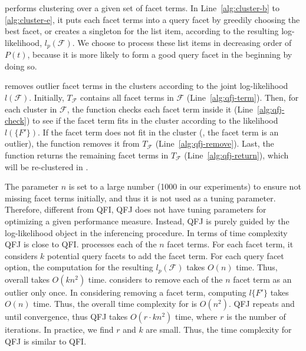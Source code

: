  performs clustering over a given set of facet terms.
In Line~\ref{alg:cluster-b} to \ref{alg:cluster-e}, it puts each facet terms into a query facet by greedily choosing the best facet, or creates a singleton for the list item, according to the resulting log-likelihood, $l_p(\mathcal{F})$.
We choose to process these list items in decreasing order of $P(t)$, because it is more likely to form a good query facet in the beginning by doing so.

 removes outlier facet terms in the clusters according to the joint log-likelihood $l(\mathcal{F})$. Initially, $T_\mathcal{F}$ contains all facet terms in $\mathcal{F}$ (Line~\ref{alg:qfj-term}). Then, for each cluster in $\mathcal{F}$, the function checks each facet term inside it (Line~\ref{alg:qfj-check}) to see if the facet term fits in the cluster according to the likelihood $l(\{F'\})$. If the facet term does not fit in the cluster (\ie, the facet term is an outlier), the function removes it from $T_\mathcal{F}$ (Line~\ref{alg:qfj-remove}). Last, the function returns the remaining facet terms in $T_\mathcal{F}$ (Line~\ref{alg:qfj-return}), which will be re-clustered in .

The parameter $n$ is set to a large number (1000 in our experiments) to ensure not missing facet terms initially, and thus it is not used as a tuning parameter. Therefore, different from QFI, QFJ does not have tuning parameters for optimizing a given performance measure. Instead, QFJ is purely guided by the log-likelihood object in the inferencing procedure. In terms of time complexity QFJ is close to QFI.  processes each of the $n$ facet terms. For each facet term, it considers $k$ potential query facets to add the facet term. For each query facet option, the computation for the resulting $l_p(\mathcal{F})$ takes $O(n)$ time. Thus, overall  takes $O(kn^2)$ time.  considers to remove each of the $n$ facet term as an outlier only once. In considering removing a facet term, computing $l\{F'\}$ takes $O(n)$ time. Thus, the overall time complexity for  is $O(n^2)$. QFJ repeats  and  
until convergence, thus QFJ takes $O(r \cdot k n^2)$ time, where $r$ is the number of iterations. In practice, we find $r$ and $k$ are small. Thus, the time complexity for QFJ is similar to QFI.



